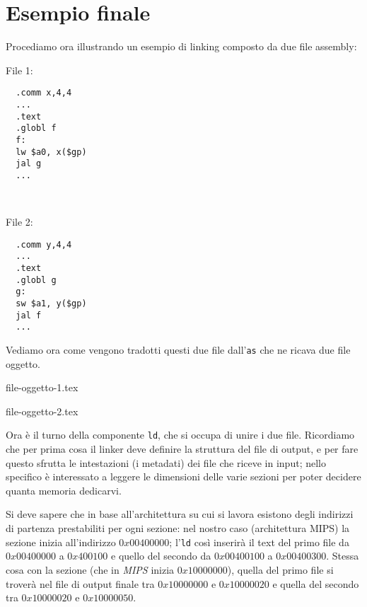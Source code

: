 \section{Esempio finale}
Procediamo ora illustrando un esempio di linking composto da due file assembly:
\begin{center}
\begin{minipage}{0.3\textwidth}
\begin{center}File 1:\end{center}
\begin{verbatim}
  .comm x,4,4
  ...
  .text
  .globl f
  f:
  lw $a0, x($gp)
  jal g
  ...
\end{verbatim}
\end{minipage}%
\begin{minipage}{0.2\textwidth}
~
\end{minipage}%
\begin{minipage}{0.3\textwidth}
\begin{center}File 2:\end{center}
\begin{verbatim}
  .comm y,4,4
  ...
  .text
  .globl g
  g:
  sw $a1, y($gp)
  jal f
  ...
\end{verbatim}
\end{minipage}
\end{center}
Vediamo ora come vengono tradotti questi due file dall'\texttt{as} che ne ricava due file oggetto.
\begin{table}[H]
	{file-oggetto-1.tex}
	\caption{File oggetto 1}
\end{table}
\begin{table}[H]
	{file-oggetto-2.tex}
	\caption{File oggetto 2}
\end{table}
Ora è il turno della componente \texttt{ld}, che si occupa di unire i due file. Ricordiamo che per prima cosa il linker deve definire la struttura del file di output, e per fare questo sfrutta le intestazioni (i metadati) dei file che riceve in input; nello specifico è interessato a leggere le dimensioni delle varie sezioni per poter decidere quanta memoria dedicarvi.

Si deve sapere che in base all'architettura su cui si lavora esistono degli indirizzi di partenza prestabiliti per ogni sezione: nel nostro caso (architettura MIPS) la sezione  inizia all'indirizzo \(0x00400000\); l'\texttt{ld} così inserirà il text del primo file da \(0x00400000\) a \(0x400100\) e quello del secondo da \(0x00400100\) a \(0x00400300\).
Stessa cosa con la sezione  (che in \emph{MIPS} inizia \(0x10000000\)), quella del primo file si troverà nel file di output finale tra \(0x10000000\) e \(0x10000020\) e quella del secondo tra \(0x10000020\) e \(0x10000050\).

